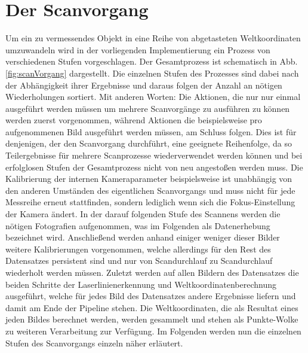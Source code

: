 \section{Der Scanvorgang}
\label{sec:scanvorgang}
Um ein zu vermessendes Objekt in eine Reihe von abgetasteten Weltkoordinaten umzuwandeln wird in der vorliegenden Implementierung ein Prozess von verschiedenen Stufen vorgeschlagen. Der Gesamtprozess ist schematisch in Abb. \ref{fig:scanVorgang} dargestellt. Die einzelnen Stufen des Prozesses sind dabei nach der Abhängigkeit ihrer Ergebnisse und daraus folgen der Anzahl an nötigen Wiederholungen sortiert. Mit anderen Worten: Die Aktionen, die nur nur einmal ausgeführt werden müssen um mehrere Scanvorgänge zu ausführen zu können werden zuerst vorgenommen, während Aktionen die beispielsweise pro aufgenommenen Bild ausgeführt werden müssen, am Schluss folgen. Dies ist für denjenigen, der den Scanvorgang durchführt, eine geeignete Reihenfolge, da so Teilergebnisse für mehrere Scanprozesse wiederverwendet werden können und bei erfolglosen Stufen der Gesamtprozess nicht von neu angestoßen werden muss. \newline
Die Kalibrierung der internen Kameraparameter beispielsweise ist unabhängig von den anderen Umständen des eigentlichen Scanvorgangs und muss nicht für jede Messreihe erneut stattfinden, sondern lediglich wenn sich die Fokus-Einstellung der Kamera ändert. In der darauf folgenden Stufe des Scannens werden die nötigen Fotografien aufgenommen, was im Folgenden als Datenerhebung bezeichnet wird. Anschließend werden anhand einiger weniger dieser Bilder weitere Kalibrierungen vorgenommen, welche allerdings für den Rest des Datensatzes persistent sind und nur von Scandurchlauf zu Scandurchlauf wiederholt werden müssen. Zuletzt werden auf allen Bildern des Datensatzes die beiden Schritte der Laserlinienerkennung und Weltkoordinatenberechnung ausgeführt, welche für jedes Bild des Datensatzes andere Ergebnisse liefern und damit am Ende der Pipeline stehen. Die Weltkoordinaten, die als Resultat eines jeden Bildes berechnet werden, werden gesammelt und stehen als Punkte-Wolke zu weiteren Verarbeitung zur Verfügung. Im Folgenden werden nun die einzelnen Stufen des Scanvorgangs einzeln näher erläutert.


